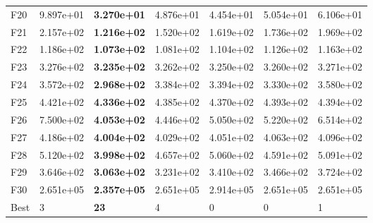 \begin{tabular}{lllllll}
F20 & 9.897e+01 & \textbf{3.270e+01} & 4.876e+01 & 4.454e+01 & 5.054e+01 & 6.106e+01 \\
F21 & 2.157e+02 & \textbf{1.216e+02} & 1.520e+02 & 1.619e+02 & 1.736e+02 & 1.969e+02 \\
F22 & 1.186e+02 & \textbf{1.073e+02} & 1.081e+02 & 1.104e+02 & 1.126e+02 & 1.163e+02 \\
F23 & 3.276e+02 & \textbf{3.235e+02} & 3.262e+02 & 3.250e+02 & 3.260e+02 & 3.271e+02 \\
F24 & 3.572e+02 & \textbf{2.968e+02} & 3.384e+02 & 3.394e+02 & 3.330e+02 & 3.580e+02 \\
F25 & 4.421e+02 & \textbf{4.336e+02} & 4.385e+02 & 4.370e+02 & 4.393e+02 & 4.394e+02 \\
F26 & 7.500e+02 & \textbf{4.053e+02} & 4.446e+02 & 5.050e+02 & 5.220e+02 & 6.514e+02 \\
F27 & 4.186e+02 & \textbf{4.004e+02} & 4.029e+02 & 4.051e+02 & 4.063e+02 & 4.096e+02 \\
F28 & 5.120e+02 & \textbf{3.998e+02} & 4.657e+02 & 5.060e+02 & 4.591e+02 & 5.091e+02 \\
F29 & 3.646e+02 & \textbf{3.063e+02} & 3.231e+02 & 3.410e+02 & 3.466e+02 & 3.724e+02 \\
F30 & 2.651e+05 & \textbf{2.357e+05} & 2.651e+05 & 2.914e+05 & 2.651e+05 & 2.651e+05 \\
\midrule
Best & 3 & \textbf{23} & 4 & 0 & 0 & 1 \\
\bottomrule
\end{tabular}
